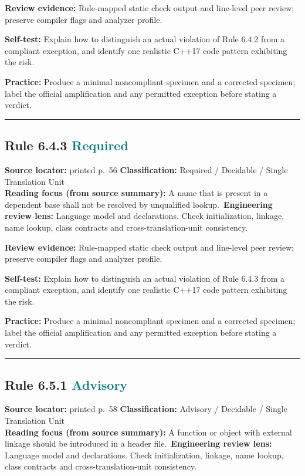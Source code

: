 \documentclass[10pt,letterpaper]{article}
\begin{document}
\textbf{Review evidence:} Rule-mapped static check output and line-level peer review; preserve compiler flags and analyzer profile.

\textbf{Self-test:} Explain how to distinguish an actual violation of Rule 6.4.2 from a compliant exception, and identify one realistic C++17 code pattern exhibiting the risk.\par
\textbf{Practice:} Produce a minimal noncompliant specimen and a corrected specimen; label the official amplification and any permitted exception before stating a verdict.
\smallskip\hrule\smallskip
\subsection*{Rule 6.4.3 \enspace \texorpdfstring{\small\textcolor{teal}{Required}}{Required}}
\noindent\textbf{Source locator:} printed p.~56 \quad\textbf{Classification:} Required / Decidable / Single Translation Unit\\
\textbf{Reading focus (from source summary):} A name that is present in a dependent base shall not be resolved by unqualified lookup.\
\textbf{Engineering review lens:} Language model and declarations. Check initialization, linkage, name lookup, class contracts and cross-translation-unit consistency.

\textbf{Review evidence:} Rule-mapped static check output and line-level peer review; preserve compiler flags and analyzer profile.

\textbf{Self-test:} Explain how to distinguish an actual violation of Rule 6.4.3 from a compliant exception, and identify one realistic C++17 code pattern exhibiting the risk.\par
\textbf{Practice:} Produce a minimal noncompliant specimen and a corrected specimen; label the official amplification and any permitted exception before stating a verdict.
\smallskip\hrule\smallskip
\subsection*{Rule 6.5.1 \enspace \texorpdfstring{\small\textcolor{teal}{Advisory}}{Advisory}}
\noindent\textbf{Source locator:} printed p.~58 \quad\textbf{Classification:} Advisory / Decidable / Single Translation Unit\\
\textbf{Reading focus (from source summary):} A function or object with external linkage should be introduced in a header file.\
\textbf{Engineering review lens:} Language model and declarations. Check initialization, linkage, name lookup, class contracts and cross-translation-unit consistency.
\end{document}

